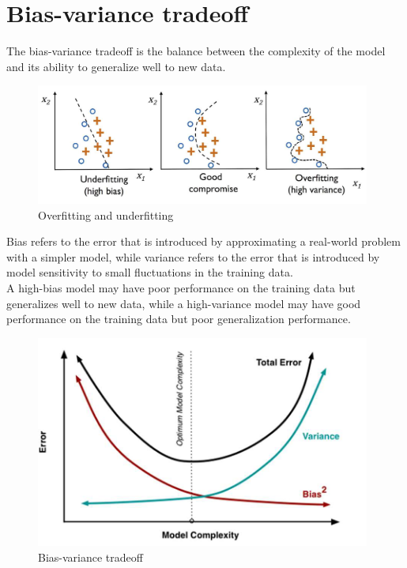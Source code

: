 \documentclass{article}
\begin{document}
\section{Bias-variance tradeoff}
The bias-variance tradeoff is the balance between the complexity of the model and its ability to generalize well to new data.\\
\begin{figure}[!ht]
    \centering
    \includegraphics[width=11cm]{./images/p112_img523.png}
    \caption{Overfitting and underfitting}
\end{figure}

\noindent Bias refers to the error that is introduced by approximating a real-world problem with a simpler model, while variance refers to the error that is introduced by model sensitivity to small fluctuations in the training data.\\
A high-bias model may have poor performance on the training data but generalizes well to new data, while a high-variance model may have good performance on the training data but poor generalization performance.\\
\begin{figure}[!ht]
    \centering
    \includegraphics[width=11cm]{./images/p118_img552.png}
    \caption{Bias-variance tradeoff}
\end{figure}
\end{document}
